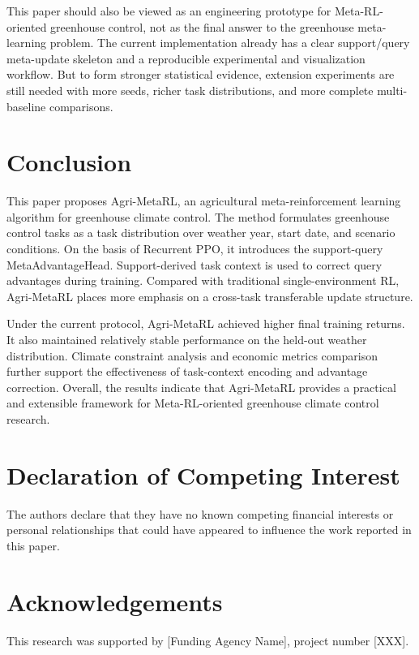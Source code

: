 \documentclass[number,preprint,review,12pt]{elsarticle}
\begin{document}
This paper should also be viewed as an engineering prototype for Meta-RL-oriented greenhouse control, not as the final answer to the greenhouse meta-learning problem. The current implementation already has a clear support/query meta-update skeleton and a reproducible experimental and visualization workflow. But to form stronger statistical evidence, extension experiments are still needed with more seeds, richer task distributions, and more complete multi-baseline comparisons.

\section{Conclusion}
This paper proposes Agri-MetaRL, an agricultural meta-reinforcement learning algorithm for greenhouse climate control. The method formulates greenhouse control tasks as a task distribution over weather year, start date, and scenario conditions. On the basis of Recurrent PPO, it introduces the support-query MetaAdvantageHead. Support-derived task context is used to correct query advantages during training. Compared with traditional single-environment RL, Agri-MetaRL places more emphasis on a cross-task transferable update structure.

Under the current protocol, Agri-MetaRL achieved higher final training returns. It also maintained relatively stable performance on the held-out weather distribution. Climate constraint analysis and economic metrics comparison further support the effectiveness of task-context encoding and advantage correction. Overall, the results indicate that Agri-MetaRL provides a practical and extensible framework for Meta-RL-oriented greenhouse climate control research.

\section*{Declaration of Competing Interest}
The authors declare that they have no known competing financial interests or personal relationships that could have appeared to influence the work reported in this paper.

\section*{Acknowledgements}
This research was supported by [Funding Agency Name], project number [XXX].



\end{document}
